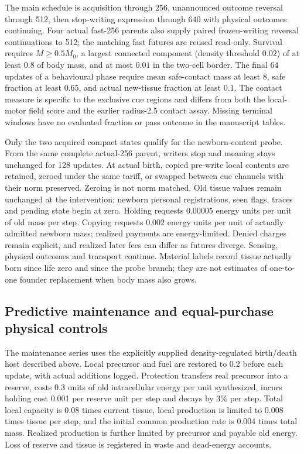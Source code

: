 The main schedule is acquisition through 256, unannounced outcome reversal through 512, then stop-writing expression through 640 with physical outcomes continuing. Four actual fast-256 parents also supply paired frozen-writing reversal continuations to 512; the matching fast futures are reused read-only. Survival requires $M\ge0.5M_0$, a largest connected component (density threshold $0.02$) of at least $0.8$ of body mass, and at most $0.01$ in the two-cell border. The final 64 updates of a behavioural phase require mean safe-contact mass at least 8, safe fraction at least $0.65$, and actual new-tissue fraction at least $0.1$. The contact measure is specific to the exclusive cue regions and differs from both the local-motor field score and the earlier radius-2.5 contact assay. Missing terminal windows have no evaluated fraction or pass outcome in the manuscript tables.

Only the two acquired compact states qualify for the newborn-content probe. From the same complete actual-256 parent, writers stop and meaning stays unchanged for 128 updates. At actual birth, copied pre-write local contents are retained, zeroed under the same tariff, or swapped between cue channels with their norm preserved. Zeroing is not norm matched. Old tissue values remain unchanged at the intervention; newborn personal registrations, seen flags, traces and pending state begin at zero. Holding requests $0.00005$ energy units per unit of old mass per step. Copying requests $0.002$ energy units per unit of actually admitted newborn mass; realized payments are energy-limited. Denied charges remain explicit, and realized later fees can differ as futures diverge. Sensing, physical outcomes and transport continue. Material labels record tissue actually born since life zero and since the probe branch; they are not estimates of one-to-one founder replacement when body mass also grows.






\subsection*{Predictive maintenance and equal-purchase physical controls}

The maintenance series uses the explicitly supplied density-regulated birth/death host described above. Local precursor and fuel are restored to 0.2 before each update, with actual additions logged. Protection transfers real precursor into a reserve, costs 0.3 units of old intracellular energy per unit synthesized, incurs holding cost 0.001 per reserve unit per step and decays by 3\% per step. Total local capacity is 0.08 times current tissue, local production is limited to 0.008 times tissue per step, and the initial common production rate is 0.004 times total mass. Realized production is further limited by precursor and payable old energy. Loss of reserve and tissue is registered in waste and dead-energy accounts.

